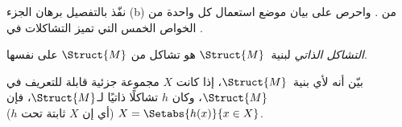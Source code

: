 \documentclass[../../../include/open-logic-section]{subfiles}
\begin{document}
\begin{prob}
نفّذ بالتفصيل برهان الجزء (b) من .
واحرص على بيان موضع استعمال كل واحدة من الخواص الخمس التي تميز التشاكلات
في .
\end{prob}

\begin{defn}
\emph{التشاكل الذاتي} لبنية~$\Struct{M}$ هو تشاكل من
$\Struct{M}$ على نفسها.
\end{defn}

\begin{prob}
بيّن أنه لأي بنية~$\Struct{M}$، إذا كانت $X$ مجموعة جزئية قابلة
للتعريف في $\Struct{M}$، وكان $h$ تشاكلًا ذاتيًا لـ$\Struct{M}$، فإن
$X = \Setabs{h(x)}{x \in X}$ (أي إن $X$ ثابتة تحت $h$).
\end{prob}
\end{document}
